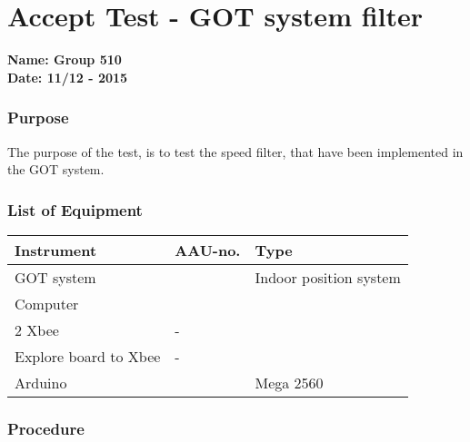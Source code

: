 \pagebreak
\section{Accept Test - GOT system filter} \label{app:AccTes2}
\textbf{Name: Group 510}\\
\textbf{Date: 11/12 - 2015}

\subsubsection{Purpose}
The purpose of the test, is to test the speed filter, that have been implemented in the GOT system.

\subsubsection{List of Equipment}
\begin{table}[H]
\begin{tabular}{|l|l|p{4cm}|}
\hline%
  \textbf{Instrument}                        &  \textbf{AAU-no.}  &  \textbf{Type}       \\
\hline%
  GOT system                               &   &  Indoor position system  \\
\hline%
  Computer                   		         &   &    \\
\hline%
  2 Xbee &  -             &    \\
\hline%
  Explore board to Xbee                 &  -             &                      \\
\hline
 Arduino & & Mega 2560 \\
\hline
\end{tabular}
\end{table}

\subsubsection{Procedure}

